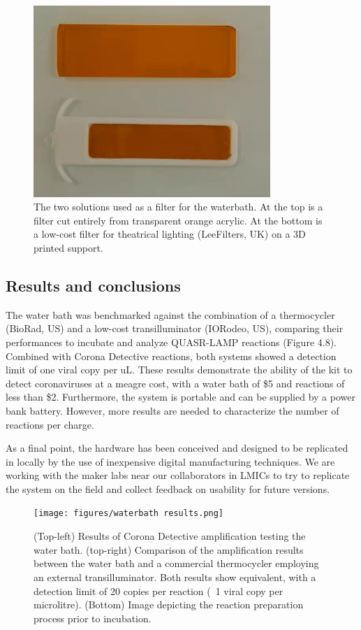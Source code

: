 \begin{figure}[h]
    \centering
    \includegraphics[width=0.8\textwidth]{figures/filters.jpg}
    \caption{The two solutions used as a filter for the waterbath. At the top is a filter cut entirely from transparent orange acrylic. At the bottom is a low-cost filter for theatrical lighting (LeeFilters, UK) on a 3D printed support.}
    \label{filter}
\end{figure}

\newpage
\subsection{Results and conclusions}
The water bath was benchmarked against the combination of a thermocycler (BioRad, US) and a low-cost transilluminator (IORodeo, US), comparing their performances to incubate and analyze QUASR-LAMP reactions (Figure 4.8). Combined with Corona Detective reactions, both systems showed a detection limit of one viral copy per uL. These results demonstrate the ability of the kit to detect coronaviruses at a meagre cost, with a water bath of \$5 and reactions of less than \$2. Furthermore, the system is portable and can be supplied by a power bank battery. However, more results are needed to characterize the number of reactions per charge. 

As a final point, the hardware has been conceived and designed to be replicated in locally by the use of inexpensive digital manufacturing techniques. We are working with the maker labs near our collaborators in LMICs to try to replicate the system on the field and collect feedback on usability for future versions.

\newpage
\null
\vfill
\begin{figure}[h]
    \centering
    \texttt{[image: figures/waterbath results.png]}
    \caption{(Top-left) Results of Corona Detective amplification testing the water bath. (top-right) Comparison of the amplification results between the water bath and a commercial thermocycler employing an external transilluminator. Both results show equivalent, with a detection limit of 20 copies per reaction (~1 viral copy per microlitre). (Bottom) Image depicting the reaction preparation process prior to incubation.}
    \label{wb results}
\end{figure}
\vfill


